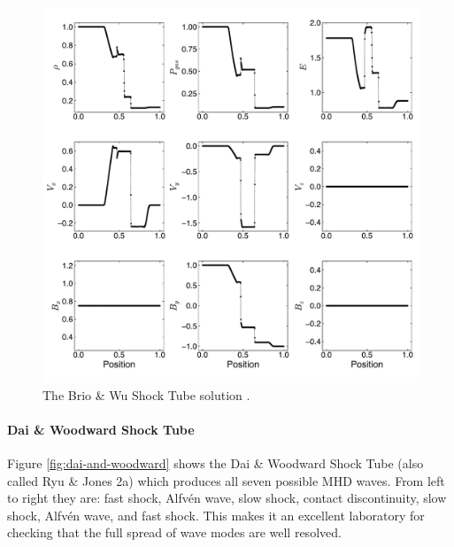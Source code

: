 \documentclass[modern, linenumbers]{aastex631}
\newcommand*{\img}[1]{%
    \raisebox{-.05\baselineskip}{%
        \texttt{[image: \#1]}%
    }%
}
\begin{document}
\begin{figure}[ht!]
    \includegraphics[width=\linewidth]{b-and-w.pdf}
    \caption{The Brio \& Wu Shock Tube solution \citep{brio_wu_1988}.
    \href{https://zenodo.org/records/10927223}{\img{zenodo-gradient-200.png}}}
    \label{fig:brio-and-wu}
\end{figure}

\paragraph{Dai \& Woodward Shock Tube}
Figure \ref{fig:dai-and-woodward} shows the Dai \& Woodward Shock Tube (also called Ryu \& Jones 2a) \citep{dai_woodward_1998, ryu_jones_1995} which produces all seven possible MHD waves. From left to right they are: fast shock, Alfvén wave, slow shock, contact discontinuity, slow shock, Alfvén wave, and fast shock. This makes it an excellent laboratory for checking that the full spread of wave modes are well resolved.
\end{document}
